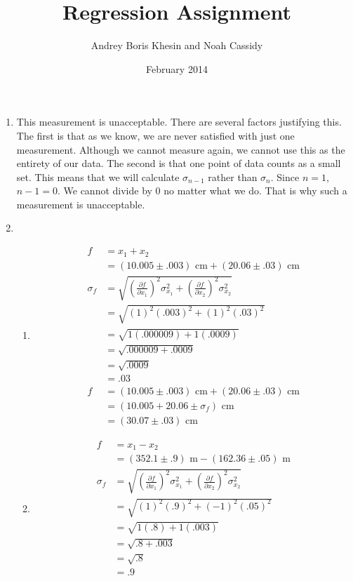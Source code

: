 \documentclass{article}
\title{Regression Assignment}
\author{Andrey Boris Khesin and Noah Cassidy}
\date{February 2014}
\begin{document}
\maketitle
\begin{enumerate}
\item This measurement is unacceptable. There are several factors justifying this. The first is that as we know, we are never satisfied with just one measurement. Although we cannot measure again, we cannot use this as the entirety of our data. The second is that one point of data counts as a small set. This means that we will calculate $\sigma_{n - 1}$ rather than $\sigma_{n}$. Since $n = 1$, $n - 1 = 0$. We cannot divide by 0 no matter what we do. That is why such a measurement is unacceptable.
\item
\begin{enumerate}
\item
\begin{align*}
f &= x_1 + x_2\\
&= (10.005 \pm .003)\text{ cm} + (20.06 \pm .03)\text{ cm}\\
\sigma_{f} &= \sqrt{(\frac{\partial f}{\partial x_1})^2\sigma_{x_1}^2 + (\frac{\partial f}{\partial x_2})^2\sigma_{x_2}^2}\\
&= \sqrt{(1)^2(.003)^2 + (1)^2(.03)^2}\\
&= \sqrt{1(.000009) + 1(.0009)}\\
&= \sqrt{.000009 + .0009}\\
&= \sqrt{.0009}\\
&= .03\\
f &= (10.005 \pm .003)\text{ cm} + (20.06 \pm .03)\text{ cm}\\
&= (10.005 + 20.06 \pm \sigma_{f})\text{ cm}\\
&= (30.07 \pm .03)\text{ cm}
\end{align*}
\item
\begin{align*}
f &= x_1 - x_2\\
&= (352.1 \pm .9)\text{ m} - (162.36 \pm .05)\text{ m}\\
\sigma_{f} &= \sqrt{(\frac{\partial f}{\partial x_1})^2\sigma_{x_1}^2 + (\frac{\partial f}{\partial x_2})^2\sigma_{x_2}^2}\\
&= \sqrt{(1)^2(.9)^2 + (-1)^2(.05)^2}\\
&= \sqrt{1(.8) + 1(.003)}\\
&= \sqrt{.8 + .003}\\
&= \sqrt{.8}\\
&= .9\\

\end{align*}
\end{enumerate}
\end{enumerate}
\end{document}
